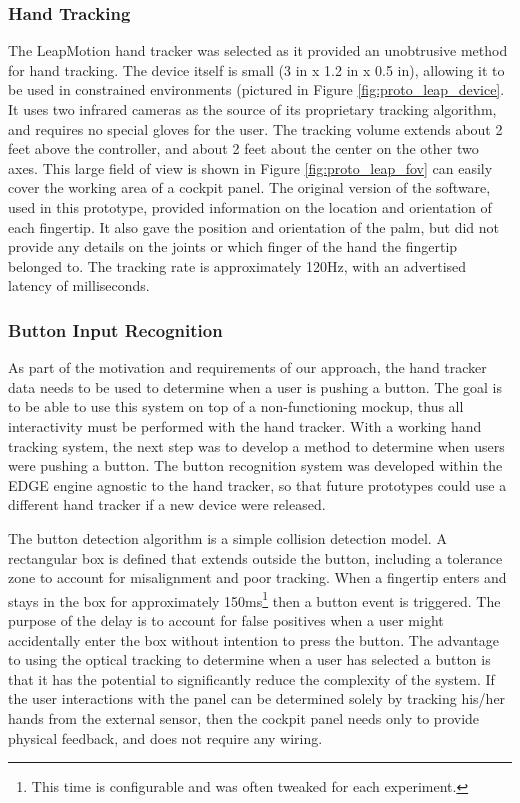 \subsubsection{Hand Tracking}

The LeapMotion hand tracker was selected as it provided an unobtrusive method for hand tracking.
The device itself is small (3 in x 1.2 in x 0.5 in), allowing it to be used in constrained environments (pictured in Figure \ref{fig:proto_leap_device}.
It uses two infrared cameras as the source of its proprietary tracking algorithm, and requires no special gloves for the user.
The tracking volume extends about 2 feet above the controller, and about 2 feet about the center on the other two axes.
This large field of view is shown in Figure \ref{fig:proto_leap_fov} can easily cover the working area of a cockpit panel.
The original version of the software, used in this prototype, provided information on the location and orientation of each fingertip.
It also gave the position and orientation of the palm, but did not provide any details on the joints or which finger of the hand the fingertip belonged to.
The tracking rate is approximately 120Hz, with an advertised latency of milliseconds.

\subsubsection{Button Input Recognition}

As part of the motivation and requirements of our approach, the hand tracker data needs to be used to determine when a user is pushing a button.
The goal is to be able to use this system on top of a non-functioning mockup, thus all interactivity must be performed with the hand tracker.
With a working hand tracking system, the next step was to develop a method to determine when users were pushing a button.
The button recognition system was developed within the EDGE engine agnostic to the hand tracker, so that future prototypes could use a different hand tracker if a new device were released.

The button detection algorithm is a simple collision detection model.
A rectangular box is defined that extends outside the button, including a tolerance zone to account for misalignment and poor tracking.
When a fingertip enters and stays in the box for approximately 150ms\footnote{This time is configurable and was often tweaked for each experiment.} then a button event is triggered.
The purpose of the delay is to account for false positives when a user might accidentally enter the box without intention to press the button.
The advantage to using the optical tracking to determine when a user has selected a button is that it has the potential to significantly reduce the complexity of the system.
If the user interactions with the panel can be determined solely by tracking his/her hands from the external sensor, then the cockpit panel needs only to provide physical feedback, and does not require any wiring.

